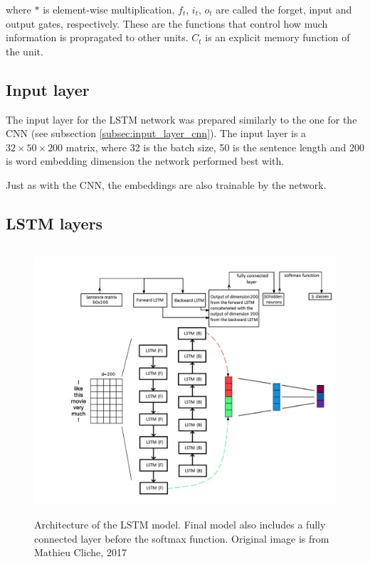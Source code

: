 \documentclass[10pt,conference,compsocconf]{IEEEtran}
\begin{document}
where $*$ is element-wise multiplication, $f_t$, $i_t$, $o_t$ are called the forget, input and output gates, respectively. These are the functions that control how much information is propragated to other units. $C_t$ is an explicit memory function of the unit. 

\subsection{Input layer} \label{subsec:input_layer_lstm}

The input layer for the LSTM network was prepared similarly to the one for the CNN (see subsection \ref{subsec:input_layer_cnn}). The input layer is a $32 \times 50 \times 200$ matrix, where 32 is the batch size, 50 is the sentence length and 200 is word embedding dimension the network performed best with. 

Just as with the CNN, the embeddings are also trainable by the network.

\subsection{LSTM layers} \label{subsec:lstm_layers}

\begin{figure}[h]
\includegraphics[width = 12cm, height = 10cm]{lstm_arch}
\centering
\caption{Architecture of the LSTM model. Final model also includes a fully connected layer before the softmax function. Original image is from Mathieu Cliche, 2017 \cite{BB_twtr_at_semeval}}
\label{fig:lstm_arch}
\end{figure}
\end{document}
